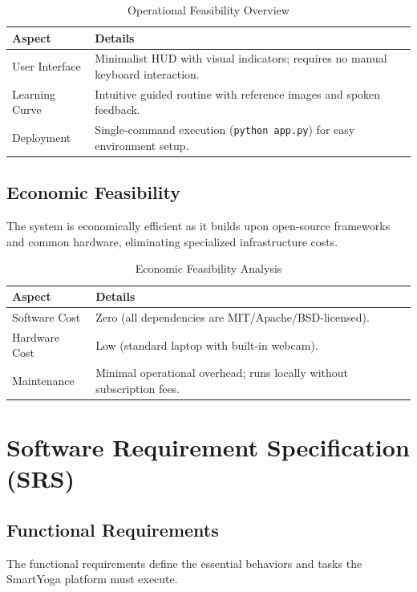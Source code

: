 \begin{table}[H]
    \centering
    \caption{Operational Feasibility Overview}
    \begin{tabular}{|p{}|p{}|}
        \hline
        \textbf{Aspect} & \textbf{Details} \\
        \hline
        User Interface & Minimalist HUD with visual indicators; requires no manual keyboard interaction. \\
        \hline
        Learning Curve & Intuitive guided routine with reference images and spoken feedback. \\
        \hline
        Deployment & Single-command execution (\texttt{python app.py}) for easy environment setup. \\
        \hline
    \end{tabular}
    \label{tab:opfeas}
\end{table}

\subsection{Economic Feasibility}
The system is economically efficient as it builds upon open-source frameworks and common hardware, eliminating specialized infrastructure costs.

\begin{table}[H]
    \centering
    \caption{Economic Feasibility Analysis}
    \begin{tabular}{|p{}|p{}|}
        \hline
        \textbf{Aspect} & \textbf{Details} \\
        \hline
        Software Cost & Zero (all dependencies are MIT/Apache/BSD-licensed). \\
        \hline
        Hardware Cost & Low (standard laptop with built-in webcam). \\
        \hline
        Maintenance & Minimal operational overhead; runs locally without subscription fees. \\
        \hline
    \end{tabular}
    \label{tab:econfeas}
\end{table}

\section{Software Requirement Specification (SRS)}
\subsection{Functional Requirements}
The functional requirements define the essential behaviors and tasks the SmartYoga platform must execute.

